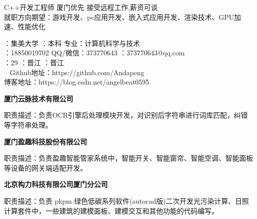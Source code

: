 \documentclass{resume} %
\begin{document}

\begin{rSection}{}
	C++开发工程师 \qquad\faBuildingO 厦门优先 \qquad 接受远程工作,薪资可谈 \\
	就职方向期望：游戏开发、pc应用开发、嵌入式应用开发、渲染技术、GPU加速、性能优化
\end{rSection}


\begin{rSection}{}
	：集美大学 \qquad \qquad{}：本科 \qquad \quad 专业：计算机科学与技术\\
	\qquad {}：18850019702 \qquad \faComments QQ/微信：373770643  \qquad {}：373770643@qq.com \\
	：29 \qquad {}：晋江	\qquad {}：晋江 \\
     \faGithubAlt~ Github地址：https://github.com/Andapeng\\
	\faLink 博客地址：https://blog.csdn.net/angelbeat0595
	
	
\end{rSection}



\begin{rSection}{}

\textbf{厦门云脉技术有限公司}\qquad\qquad{}\qquad\qquad{}
\item	职责描述：负责OCR引擎后处理模块开发，对识别后字符串进行词库匹配，纠错等字符串处理。


\textbf{厦门盈趣科技股份有限公司}\qquad\qquad{}\qquad\qquad{}
\item	职责描述：负责盈趣智能管家系统中，智能开关、智能窗帘、智能空调、智能面板等设备的网关端适配开发。

\textbf{北京构力科技有限公司厦门分公司}\qquad\qquad{}\qquad\qquad{}
\item	职责描述：负责 pkpm 绿色低碳系列软件(autocad版)二次开发光污染计算、日照计算套件中，一些建筑的建模面板、建模交互和其他功能的代码编写。

\end{rSection}
\end{document}
